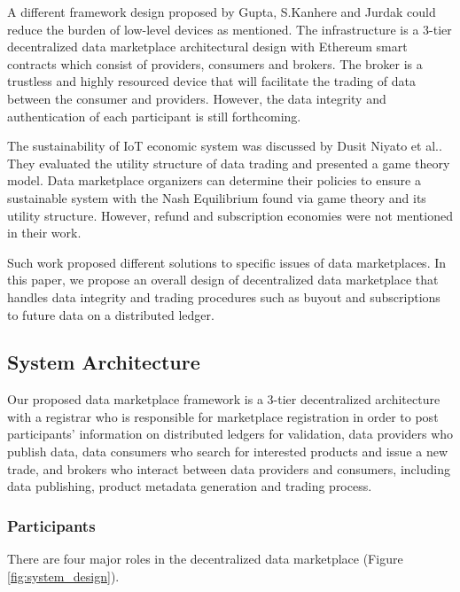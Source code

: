 \documentclass[journal,article,submit,moreauthors,pdftex]{Definitions/mdpi}
\begin{document}
A different framework design proposed by Gupta, S.Kanhere and Jurdak\cite{3tierDataMarket} could reduce the burden of low-level devices as mentioned. The infrastructure is a 3-tier decentralized data marketplace architectural design with Ethereum smart contracts which consist of providers, consumers and brokers. The broker is a trustless and highly resourced device that will facilitate the trading of data between the consumer and providers. However, the data integrity and authentication of each participant is still forthcoming.

The sustainability of IoT economic system was discussed by Dusit Niyato et al.\cite{UtilityStruct}. They evaluated the utility structure of data trading and presented a game theory model.  Data marketplace organizers can determine their policies to ensure a sustainable system with the Nash Equilibrium found via game theory and its utility structure. However, refund and subscription economies were not mentioned in their work.

Such work proposed different solutions to specific issues of data marketplaces. In this paper, we propose an overall design of decentralized data marketplace that handles data integrity and trading procedures such as buyout and subscriptions to future data on a distributed ledger.

\subsection{System Architecture}
Our proposed data marketplace framework is a 3-tier decentralized architecture with a registrar who is responsible for marketplace registration in order to post participants' information on distributed ledgers for validation, data providers who publish data, data consumers who search for interested products and issue a new trade, and brokers who interact between data providers and consumers, including data publishing, product metadata generation and trading process.

\subsubsection{Participants}
There are four major roles in the decentralized data marketplace (Figure \ref{fig:system_design}).
\end{document}
